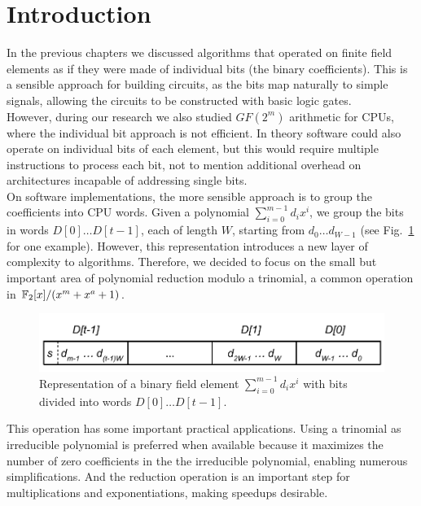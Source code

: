 \section{Introduction}

In the previous chapters we discussed algorithms that operated on finite field elements as if they were made of individual bits (the binary coefficients). This is a sensible approach for building circuits, as the bits map naturally to simple signals, allowing the circuits to be constructed with basic logic gates. \\

However, during our research we also studied $GF(2^m)$ arithmetic for CPUs, where the individual bit approach is not efficient. In theory software could also operate on individual bits of each element, but this would require multiple instructions to process each bit, not to mention additional overhead on architectures incapable of addressing single bits. \\

On software implementations, the more sensible approach is to group the coefficients into CPU words. Given a polynomial $\sum_{i=0}^{m-1} d_i x^i$, we group the bits in words $D[0] \ldots D[t-1]$, each of length $W$, starting from $d_0 \ldots d_{W-1}$ (see Fig.~\ref{fig:word:simple_words} for one example). However, this representation introduces a new layer of complexity to algorithms. Therefore, we decided to focus on the small but important area of polynomial reduction modulo a trinomial, a common operation in $\mathbb{F}_2[x]/(x^m+x^a+1)$. \\

\begin{figure}
  \caption{Representation of a binary field element $\sum_{i=0}^{m-1} d_i x^i$ with bits divided into words $D[0] \ldots D[t-1]$.}
  \label{fig:word:simple_words}
  \centering
  \includegraphics[width = .90\columnwidth]{figures/element-word.pdf}
\end{figure}

This operation has some important practical applications. Using a trinomial as irreducible polynomial is preferred when available because it maximizes the number of zero coefficients in the the irreducible polynomial, enabling numerous simplifications. And the reduction operation is an important step for multiplications and exponentiations, making speedups desirable.\\

